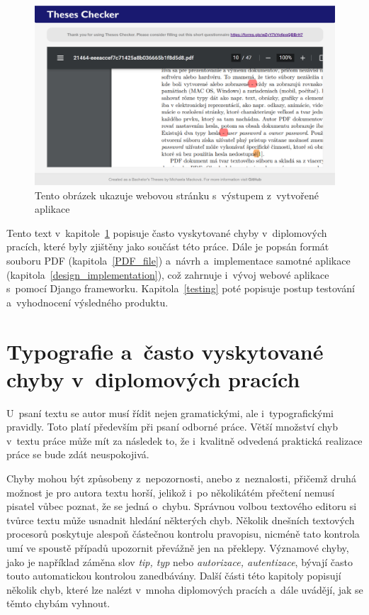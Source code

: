 \begin{figure}[H]
    \centering
    \includegraphics[width=\linewidth]{obrazky-figures/screenshot-page2.png}
    \caption{Tento obrázek ukazuje webovou stránku s~výstupem z~vytvořené aplikace}
    \label{pic_theses_checker_page2}
\end{figure}

Tento text v~kapitole~\ref{frequent_mistakes} popisuje často vyskytované chyby
v~diplomových pracích, které byly zjištěny jako součást této práce. Dále je
popsán formát souboru PDF (kapitola~\ref{PDF_file}) a~návrh a~implementace samotné
aplikace (kapitola~\ref{design_implementation}), což zahrnuje i~vývoj webové
aplikace s~pomocí Django frameworku. Kapitola~\ref{testing} poté popisuje postup
testování a~vyhodnocení výsledného produktu.






\chapter{Typografie a~často vyskytované chyby v~diplomových pracích} \label{frequent_mistakes}
U~psaní textu se autor musí řídit nejen gramatickými, ale i~typografickými
pravidly. Toto platí především při psaní odborné práce. Větší množství chyb
v~textu práce může mít za následek to, že i~kvalitně odvedená praktická realizace
práce se bude zdát neuspokojivá.

Chyby mohou být způsobeny z~nepozornosti, anebo z~neznalosti, přičemž druhá možnost
je pro autora textu horší, jelikož i~po několikátém přečtení nemusí pisatel vůbec
poznat, že se jedná o~chybu. Správnou volbou textového editoru si tvůrce textu
může usnadnit hledání některých chyb. Několik dnešních textových procesorů poskytuje
alespoň částečnou kontrolu pravopisu, nicméně tato kontrola umí ve spoustě případů
upozornit převážně jen na překlepy. Významové chyby, jako je například záměna slov
\emph{tip, typ} nebo \emph{autorizace, autentizace}, bývají často touto
automatickou kontrolou zanedbávány. Další části této kapitoly popisují několik
chyb, které lze nalézt v~mnoha diplomových pracích a~dále uvádějí, jak se těmto
chybám vyhnout.



